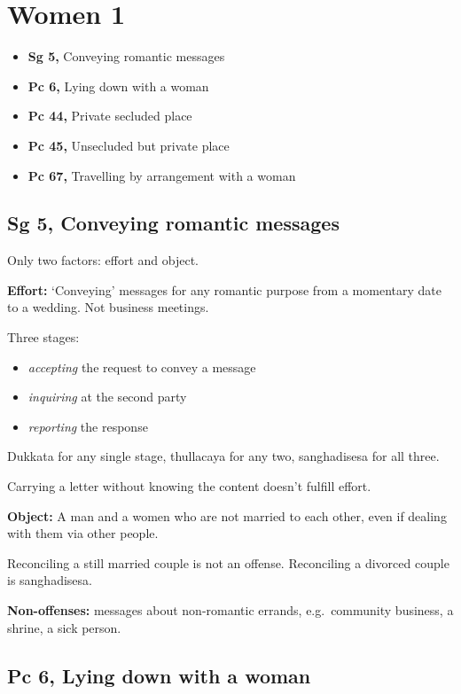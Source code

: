 \chapter{Women 1}

\begin{itemize}
\tightlist
\item
  \textbf{Sg 5,} Conveying romantic messages
\item
  \textbf{Pc 6,} Lying down with a woman
\item
  \textbf{Pc 44,} Private secluded place
\item
  \textbf{Pc 45,} Unsecluded but private place
\item
  \textbf{Pc 67,} Travelling by arrangement with a woman
\end{itemize}

\section{Sg 5, Conveying romantic messages}

Only two factors: effort and object.

\textbf{Effort:} `Conveying' messages for any romantic purpose from a
momentary date to a wedding. Not business meetings.

Three stages:

\begin{itemize}
\tightlist
\item
  \emph{accepting} the request to convey a message
\item
  \emph{inquiring} at the second party
\item
  \emph{reporting} the response
\end{itemize}

Dukkata for any single stage, thullacaya for any two, sanghadisesa for
all three.

Carrying a letter without knowing the content doesn't fulfill effort.

\textbf{Object:} A man and a women who are not married to each other,
even if dealing with them via other people.

Reconciling a still married couple is not an offense. Reconciling a
divorced couple is sanghadisesa.

\textbf{Non-offenses:} messages about non-romantic errands,
e.g.~community business, a shrine, a sick person.

\section{Pc 6, Lying down with a woman}

